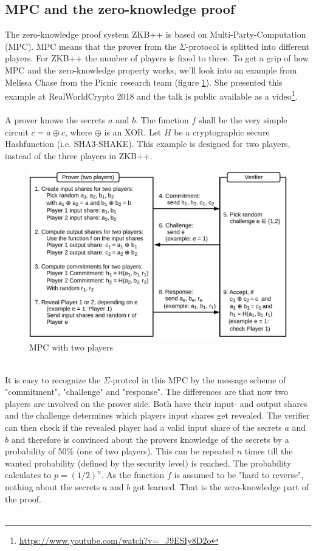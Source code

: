 \documentclass[]{article}
\begin{document}
\subsection{MPC and the zero-knowledge proof} 
The zero-knowledge proof system ZKB++ is based on Multi-Party-Computation (MPC). MPC means that the prover from the $\Sigma$-protocol is splitted into different players. For ZKB++ the number of players is fixed to three. To get a grip of how MPC and the zero-knowledge property works, we'll look into an example from Melissa Chase from the Picnic research team (figure \ref{fig:mpc}). She presented this example at RealWorldCrypto 2018 and the talk is public available as a video\footnote{\url{https://www.youtube.com/watch?v=_J9ESIy8D2o}}.\\ \\
A prover knows the secrets $a$ and $b$. The function $f$ shall be the very simple circuit $c=a\oplus c$, where $\oplus$ is an XOR. Let $H$ be a cryptographic secure Hashfunction (i.e. SHA3-SHAKE). This example is designed for two players, instead of the three players in ZKB++.\\
\begin{figure}[htbp]
\center
\includegraphics[width=1.0\textwidth]{pics/mpc2player.pdf}
\caption{MPC with two players}
\label{fig:mpc}
\end{figure}\\
It is easy to recognize the $\Sigma$-protcol in this MPC by the message scheme of "commitment", "challenge" and "response". The differences are that now two players are involved on the prover side. Both have their input- and output shares and the challenge determines which players input shares get revealed. The verifier can then check if the revealed player had a valid input share of the secrets $a$ and $b$ and therefore is convinced about the provers knowledge of the secrets by a probability of 50\% (one of two players). This can be repeated $n$ times till the wanted probability (defined by the security level) is reached. The probability calculates to $p = (1/2)^{n}$. As the function $f$ is assumed to be "hard to reverse", nothing about the secrets $a$ and $b$ got learned. That is the zero-knowledge part of the proof.\\ \\
\end{document}
